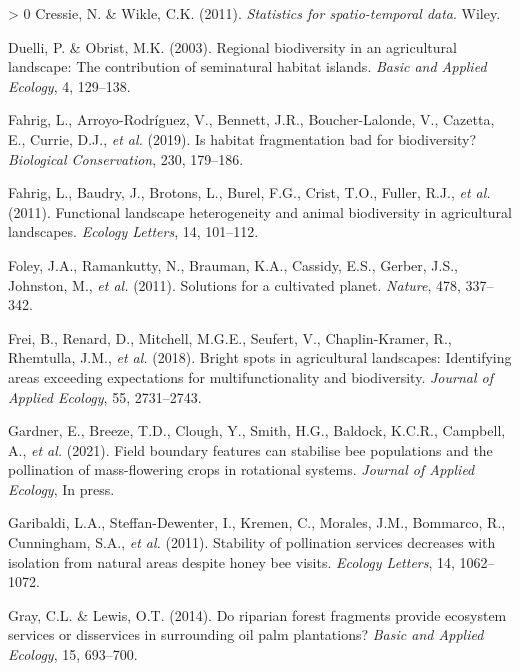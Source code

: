 \documentclass[]{elsarticle} %
\newlength{\cslhangindent}
\newenvironment{CSLReferences}[3] %
 {%
  \setlength{\parindent}{0pt}
  \ifodd #1 \everypar{\setlength{\hangindent}{\cslhangindent}}\ignorespaces\fi
  \ifnum #2 > 0
  \setlength{\parskip}{#2\baselineskip}
  \fi
 }%
 {}
\begin{document}
\begin{CSLReferences}{1}{0}
\leavevmode\hypertarget{ref-cressie2011}{}%
Cressie, N. \& Wikle, C.K. (2011). \emph{Statistics for spatio-temporal data}. Wiley.

\leavevmode\hypertarget{ref-duelli2003}{}%
Duelli, P. \& Obrist, M.K. (2003). Regional biodiversity in an agricultural landscape: The contribution of seminatural habitat islands. \emph{Basic and Applied Ecology}, 4, 129--138.

\leavevmode\hypertarget{ref-fahrig2019}{}%
Fahrig, L., Arroyo-Rodríguez, V., Bennett, J.R., Boucher-Lalonde, V., Cazetta, E., Currie, D.J., \emph{et al.} (2019). Is habitat fragmentation bad for biodiversity? \emph{Biological Conservation}, 230, 179--186.

\leavevmode\hypertarget{ref-fahrig2011}{}%
Fahrig, L., Baudry, J., Brotons, L., Burel, F.G., Crist, T.O., Fuller, R.J., \emph{et al.} (2011). Functional landscape heterogeneity and animal biodiversity in agricultural landscapes. \emph{Ecology Letters}, 14, 101--112.

\leavevmode\hypertarget{ref-foley2011}{}%
Foley, J.A., Ramankutty, N., Brauman, K.A., Cassidy, E.S., Gerber, J.S., Johnston, M., \emph{et al.} (2011). Solutions for a cultivated planet. \emph{Nature}, 478, 337--342.

\leavevmode\hypertarget{ref-frei2018}{}%
Frei, B., Renard, D., Mitchell, M.G.E., Seufert, V., Chaplin-Kramer, R., Rhemtulla, J.M., \emph{et al.} (2018). Bright spots in agricultural landscapes: Identifying areas exceeding expectations for multifunctionality and biodiversity. \emph{Journal of Applied Ecology}, 55, 2731--2743.

\leavevmode\hypertarget{ref-gardner2021}{}%
Gardner, E., Breeze, T.D., Clough, Y., Smith, H.G., Baldock, K.C.R., Campbell, A., \emph{et al.} (2021). Field boundary features can stabilise bee populations and the pollination of mass-flowering crops in rotational systems. \emph{Journal of Applied Ecology}, In press.

\leavevmode\hypertarget{ref-garibaldi2011}{}%
Garibaldi, L.A., Steffan-Dewenter, I., Kremen, C., Morales, J.M., Bommarco, R., Cunningham, S.A., \emph{et al.} (2011). Stability of pollination services decreases with isolation from natural areas despite honey bee visits. \emph{Ecology Letters}, 14, 1062--1072.

\leavevmode\hypertarget{ref-gray2014}{}%
Gray, C.L. \& Lewis, O.T. (2014). Do riparian forest fragments provide ecosystem services or disservices in surrounding oil palm plantations? \emph{Basic and Applied Ecology}, 15, 693--700.


\end{CSLReferences}
\end{document}
